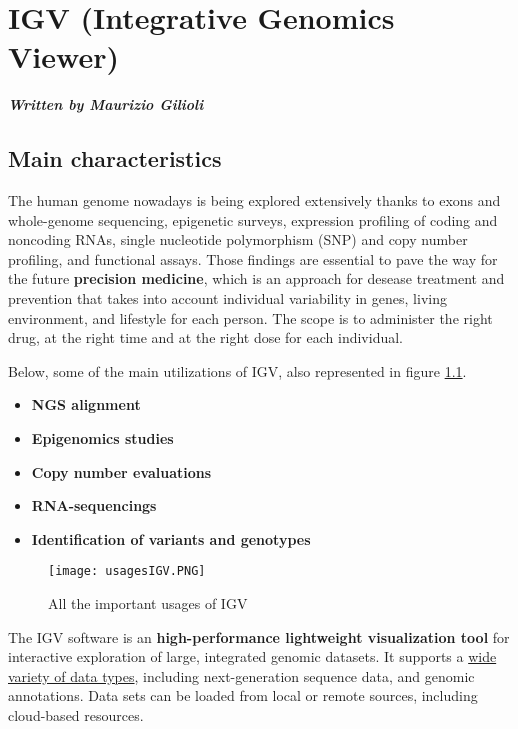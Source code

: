 \graphicspath{{chapters/IGVImages/}}

\chapter{IGV (Integrative Genomics Viewer)} \label{chap: IGV}

\textbf{\textit{Written by Maurizio Gilioli}}

\section{Main characteristics}
The human genome nowadays is being explored extensively thanks to exons and
whole-genome sequencing, epigenetic surveys, expression profiling of coding and
noncoding RNAs, single nucleotide polymorphism (SNP) and copy number profiling,
and functional assays. Those findings are essential to pave the way for the
future \textbf{precision medicine}, which is an approach for desease treatment
and prevention that takes into account individual variability in genes, living
environment, and lifestyle for each person. The scope is to administer the right
drug, at the right time and at the right dose for each individual.

Below, some of the main utilizations of IGV, also represented in figure
\ref*{IGVusages}.
\begin{itemize}
  \item \textbf{NGS alignment}
  \item \textbf{Epigenomics studies}
  \item \textbf{Copy number evaluations}
  \item \textbf{RNA-sequencings}
  \item \textbf{Identification of variants and genotypes}
\end{itemize}

\begin{figure}[H]
    \caption{All the important usages of IGV}
    \centering
    \texttt{[image: usagesIGV.PNG]}
    \label{IGVusages}
\end{figure}

The IGV software is an \textbf{high-performance lightweight visualization tool}
for interactive exploration of large, integrated genomic datasets. It supports a
\underline{wide variety of data types}, including next-generation sequence data,
and genomic annotations. Data sets can be loaded from local or remote sources,
including cloud-based resources.\\

